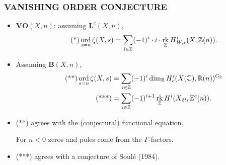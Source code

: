 \documentclass[handout]{beamer}
\newcommand{\CC}{\mathbb{C}}
\newcommand{\RR}{\mathbb{R}}
\newcommand{\ZZ}{\mathbb{Z}}
\DeclareMathOperator{\ord}{ord}
\DeclareMathOperator{\rk}{rk}
\newcommand{\et}{\text{\it ét}}
\newcommand{\Wc}{\text{\it W,c}}
\begin{document}

\begin{frame}
  \frametitle{VANISHING ORDER CONJECTURE}

  \begin{itemize}
  \item<2-> $\mathbf{VO} (X,n)$: assuming $\mathbf{L}^c (X,n)$,
    \[ \tag{*} \ord_{s=n} \zeta (X,s) =
      \sum_{i \in \ZZ} (-1)^i \cdot i \cdot \rk_\ZZ H^i_\Wc (X, \ZZ (n)). \]

  \item<3-> Assuming $\mathbf{B} (X,n)$,
    \begin{align}
      \tag{**} \ord_{s=n} \zeta (X,s) & = \sum_{i \in \ZZ} (-1)^i \dim_\RR H^i_c (X(\CC), \RR (n))^{G_\RR} \\
      \tag{***} & = \sum_{i \in \ZZ} (-1)^{i+1} \rk_\ZZ H^i (X_\et, \ZZ^c (n)).
    \end{align}

  \item<4-> (**) agrees with the (conjectural) functional equation.

    For $n < 0$ zeros and poles come from the $\Gamma$-factors.

  \item<5-> (***) agrees with a conjecture of Soulé (1984).
  \end{itemize}
\end{frame}

\end{document}
